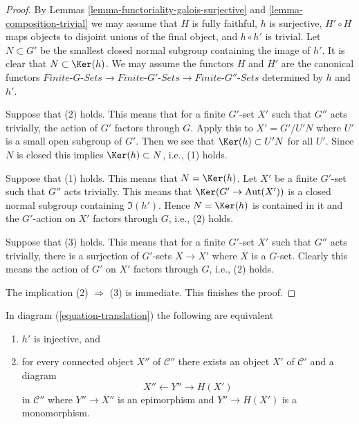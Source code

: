 \begin{proof}
By Lemmas \ref{lemma-functoriality-galois-surjective} and
\ref{lemma-composition-trivial} we may assume that
$H$ is fully faithful, $h$ is surjective, $H' \circ H$ maps
objects to disjoint unions of the final object, and $h \circ h'$
is trivial. Let $N \subset G'$ be the smallest closed normal
subgroup containing the image of $h'$. It is clear that
$N \subset \Ker(h)$.
We may assume the functors $H$ and $H'$ are the canonical functors
$\textit{Finite-}G\textit{-Sets} \to \textit{Finite-}G'\textit{-Sets}
\to \textit{Finite-}G''\textit{-Sets}$ determined by $h$ and $h'$.

\medskip\noindent
Suppose that (2) holds. This means that for a finite $G'$-set $X'$
such that $G''$ acts trivially, the action of $G'$ factors through $G$.
Apply this to $X' = G'/U'N$ where $U'$ is a small open subgroup of $G'$.
Then we see that $\Ker(h) \subset U'N$ for all $U'$. Since $N$ is closed
this implies $\Ker(h) \subset N$, i.e., (1) holds.

\medskip\noindent
Suppose that (1) holds. This means that $N = \Ker(h)$. Let $X'$ be a
finite $G'$-set such that $G''$ acts trivially. This means that
$\Ker(G' \to \text{Aut}(X'))$ is a closed normal subgroup containing
$\Im(h')$. Hence $N = \Ker(h)$ is contained in it and the $G'$-action
on $X'$ factors through $G$, i.e., (2) holds.

\medskip\noindent
Suppose that (3) holds. This means that for a finite $G'$-set $X'$
such that $G''$ acts trivially, there is a surjection of $G'$-sets
$X \to X'$ where $X$ is a $G$-set. Clearly this means the action of
$G'$ on $X'$ factors through $G$, i.e., (2) holds.

\medskip\noindent
The implication (2) $\Rightarrow$ (3) is immediate. This finishes the proof.
\end{proof}

\begin{lemma}
\label{lemma-functoriality-galois-injective}
In diagram (\ref{equation-translation}) the following are equivalent
\begin{enumerate}
\item $h'$ is injective, and
\item for every connected object $X''$ of $\mathcal{C}''$
there exists an object $X'$ of $\mathcal{C}'$ and a diagram
$$
X'' \leftarrow Y'' \rightarrow H(X')
$$
in $\mathcal{C}''$ where $Y'' \to X''$ is an epimorphism and
$Y'' \to H(X')$ is a monomorphism.
\end{enumerate}
\end{lemma}

